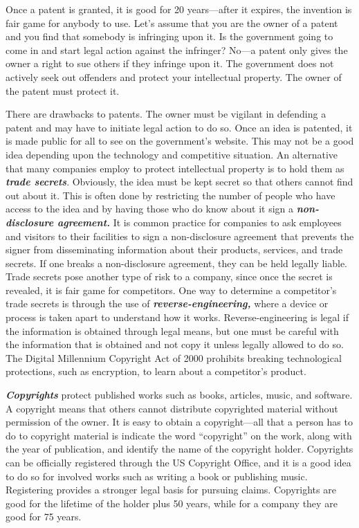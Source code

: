 Once a patent is granted, it is good for 20 years---after it expires,
the invention is fair game for anybody to use. Let's assume that you are
the owner of a patent and you find that somebody is infringing upon it.
Is the government going to come in and start legal action against the
infringer? No---a patent only gives the owner a right to sue others if
they infringe upon it. The government does not actively seek out
offenders and protect your intellectual property. The owner of the
patent must protect it.

There are drawbacks to patents. The owner must be vigilant in defending
a patent and may have to initiate legal action to do so. Once an idea is
patented, it is made public for all to see on the government's website.
This may not be a good idea depending upon the technology and
competitive situation. An alternative that many companies employ to
protect intellectual property is to hold them as \emph{\textbf{trade
secrets}}. Obviously, the idea must be kept secret so that others cannot
find out about it. This is often done by restricting the number of
people who have access to the idea and by having those who do know about
it sign a \emph{\textbf{non-disclosure agreement.}} It is common
practice for companies to ask employees and visitors to their facilities
to sign a non-disclosure agreement that prevents the signer from
disseminating information about their products, services, and trade
secrets. If one breaks a non-disclosure agreement, they can be held
legally liable. Trade secrets pose another type of risk to a company,
since once the secret is revealed, it is fair game for competitors. One
way to determine a competitor's trade secrets is through the use of
\emph{\textbf{reverse-engineering,}} where a device or process is taken
apart to understand how it works. Reverse-engineering is legal if the
information is obtained through legal means, but one must be careful
with the information that is obtained and not copy it unless legally
allowed to do so. The Digital Millennium Copyright Act of 2000 prohibits
breaking technological protections, such as encryption, to learn about a
competitor's product.

\emph{\textbf{Copyrights}} protect published works such as books,
articles, music, and software. A copyright means that others cannot
distribute copyrighted material without permission of the owner. It is
easy to obtain a copyright---all that a person has to do to copyright
material is indicate the word ``copyright'' on the work, along with the
year of publication, and identify the name of the copyright holder.
Copyrights can be officially registered through the US Copyright Office,
and it is a good idea to do so for involved works such as writing a book
or publishing music. Registering provides a stronger legal basis for
pursuing claims. Copyrights are good for the lifetime of the holder plus
50 years, while for a company they are good for 75 years.

